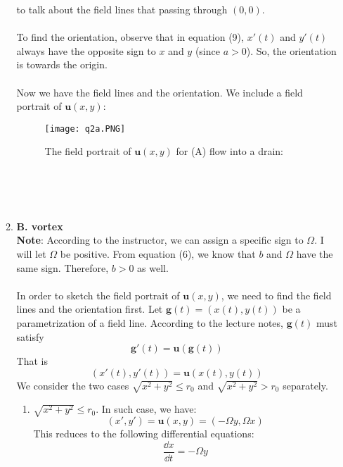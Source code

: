 \documentclass{article}
\begin{document}
\begin{enumerate}
\begin{enumerate}
  to talk about the field lines that passing through \((0,0)\). \\
  \\
  To find the orientation, observe that in equation (9),
  \(x'(t)\) and \(y'(t)\) always have the opposite sign to \(x\) and \(y\) (since \(a>0\)). So,
  the orientation is towards the origin. \\
  \\
  Now we have the field lines and the orientation. We include a field portrait of \(\mathbf{u}(x,y)\):
  \begin{figure}[ht]
      \centering
      \texttt{[image: q2a.PNG]}
      \caption{The field portrait of \(\mathbf{u}(x,y)\) for (A) flow into a drain:}
      \label{fig:label}
  \end{figure}\\
  \pagebreak \\ \\
\item\textbf{B. vortex}\\
\textbf{Note}: According to the instructor, we can assign a specific sign to \(\Omega\). I will let \(\Omega\) be positive.
From equation (6), we know that \(b\) and \(\Omega\) have the same sign. Therefore, \(b>0\) as well. \\
\\
In order to sketch the field portrait of \(\mathbf{u}(x,y)\), we need to find the field lines and the orientation first.
Let \(\mathbf{g}(t) =(x(t), y(t))\) be a parametrization of a field line.
According to the lecture notes, \(\mathbf{g}(t)\) must satisfy
\begin{equation}
  \mathbf{g}'(t) = \mathbf{u}(\mathbf{g}(t))
\end{equation}
That is
\begin{equation}
  (x'(t), y'(t)) = \mathbf{u}(x(t), y(t))
\end{equation}
We consider the two cases \(\sqrt{x^2+y^2} \le r_0\) and \(\sqrt{x^2+y^2}>r_0\) separately.
\begin{enumerate}
  \item \(\sqrt{x^2+y^2} \le r_0\). In such case, we have:
  \begin{equation}
    (x', y') = \mathbf{u}(x, y) = (-\Omega y, \Omega x)
  \end{equation}
  This reduces to the following differential equations:
  \begin{equation}
    \frac{\dd x}{\dd t} = -\Omega y
  \end{equation}
  \begin{equation}

\end{equation}
\end{enumerate}
\end{enumerate}
\end{enumerate}
\end{document}
